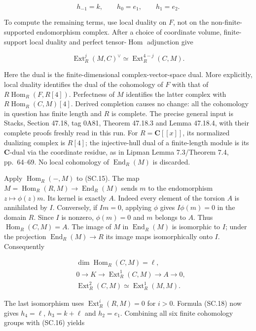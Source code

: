 \[
 h_{-1}=k,\qquad h_0=e_1,\qquad h_1=e_2.
 \tag{SC.17}
\]

To compute the remaining terms, use local duality on \(F\), not on the
non-finite-supported endomorphism complex. After a choice of coordinate
volume, finite-support local duality and perfect tensor-\(\operatorname{Hom}\) adjunction
give

\[
 \operatorname{Ext}^j_R(M,C)^\vee
      \simeq\operatorname{Ext}^{4-j}_R(C,M).
 \tag{SC.18}
\]

Here the dual is the finite-dimensional complex-vector-space dual.
More explicitly, local duality identifies the dual of the cohomology
of \(F\) with that of \(R\operatorname{Hom}_R(F,R[4])\). Perfectness of \(M\) identifies the latter
complex with \(R\operatorname{Hom}_R(C,M)[4]\). Derived completion causes no change:
all the cohomology in question has finite length and \(R\) is complete.
The precise general input is Stacks, Section 47.18, tag 0A81,
Theorem 47.18.3 and Lemma 47.18.4,\cite{SFStacksE847LocalDuality} with their complete proofs freshly
read in this run. For \(R=\mathbf C[[x]]\), its normalized dualizing complex is
\(R[4]\); the injective-hull dual of a finite-length module is its \(\mathbf C\)-dual
via the coordinate residue, as in Lipman Lemma 7.3/Theorem 7.4,
pp.~64--69.\cite{SFLipman1984} No local cohomology of \(\operatorname{End}_R(M)\) is discarded.

Apply \(\operatorname{Hom}_R(-,M)\) to (SC.15). The map \(M=\operatorname{Hom}_R(R,M)\to\operatorname{End}_R(M)\) sends
\(m\) to the endomorphism \(z\mapsto\phi(z)m\). Its kernel is exactly \(A\). Indeed
every element of the torsion \(A\) is annihilated by \(I\). Conversely, if
\(Im=0\), applying \(\phi\) gives \(I\phi(m)=0\) in the domain \(R\). Since \(I\) is
nonzero, \(\phi(m)=0\) and \(m\) belongs to \(A\). Thus \(\operatorname{Hom}_R(C,M)=A\).
The image of \(M\) in \(\operatorname{End}_R(M)\) is isomorphic to \(I\); under the projection
\(\operatorname{End}_R(M)\to R\) its image maps isomorphically onto \(I\). Consequently

\[
 \begin{split}
 &\dim\operatorname{Hom}_R(C,M)=\ell,\\
 &0\longrightarrow K\longrightarrow\operatorname{Ext}^1_R(C,M)
                    \longrightarrow A\longrightarrow0,\\
 &\operatorname{Ext}^2_R(C,M)\simeq\operatorname{Ext}^1_R(M,M).
 \end{split}
 \tag{SC.19}
\]

The last isomorphism uses \(\operatorname{Ext}^i_R(R,M)=0\) for \(i>0\). Formula (SC.18)
now gives \(h_4=\ell\), \(h_3=k+\ell\) and \(h_2=e_1\). Combining all six finite
cohomology groups with (SC.16) yields

